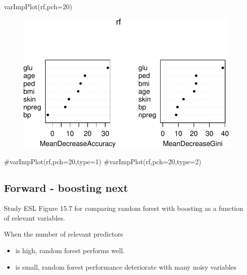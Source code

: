 \documentclass[
  letterpaper,
  DIV=11,
  numbers=noendperiod]{scrartcl}
\newenvironment{Shaded}{\begin{snugshade}}{\end{snugshade}}
\newcommand{\AttributeTok}[1]{\textcolor[rgb]{0.40,0.45,0.13}{#1}}
\newcommand{\CommentTok}[1]{\textcolor[rgb]{0.37,0.37,0.37}{#1}}
\newcommand{\DecValTok}[1]{\textcolor[rgb]{0.68,0.00,0.00}{#1}}
\newcommand{\FunctionTok}[1]{\textcolor[rgb]{0.28,0.35,0.67}{#1}}
\newcommand{\NormalTok}[1]{\textcolor[rgb]{0.00,0.23,0.31}{#1}}
\providecommand{\tightlist}{%
  \setlength{\itemsep}{0pt}\setlength{\parskip}{0pt}}\usepackage{longtable,booktabs,array}
\begin{document}
\begin{Shaded}
\begin{Highlighting}[]
\FunctionTok{varImpPlot}\NormalTok{(rf,}\AttributeTok{pch=}\DecValTok{20}\NormalTok{)}
\end{Highlighting}
\end{Shaded}

\begin{figure}[H]

{\centering \includegraphics{L13_files/figure-pdf/unnamed-chunk-23-2.pdf}

}

\end{figure}

\begin{Shaded}
\begin{Highlighting}[]
\CommentTok{\#varImpPlot(rf,pch=20,type=1)}
\CommentTok{\#varImpPlot(rf,pch=20,type=2)}
\end{Highlighting}
\end{Shaded}

\hypertarget{forward---boosting-next}{%
\subsection{Forward - boosting next}\label{forward---boosting-next}}

Study ESL Figure 15.7 for comparing random forest with boosting as a
function of relevant variables.

When the number of relevant predictors

\begin{itemize}
\tightlist
\item
  is high, random forest performs well.
\item
  is small, random forest performance deteriorate with many noisy
  variables
\end{itemize}
\end{document}
